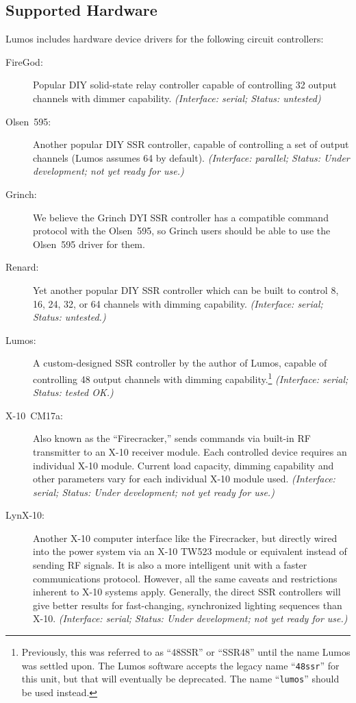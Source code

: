 \documentclass{article}
\begin{document}
\subsection{Supported Hardware}
Lumos includes hardware device drivers for the following circuit controllers:
\begin{description}
 \item[FireGod:] Popular DIY solid-state relay controller capable of
  controlling 32 output channels with dimmer capability.
  {\em (Interface: serial; Status: untested)\/}
 \item[Olsen~595:] Another popular DIY SSR controller, capable of controlling
  a set of output channels (Lumos assumes 64 by default).
  {\em (Interface: parallel; Status: Under development; not yet ready for use.)\/}
 \item[Grinch:] We believe the Grinch DYI SSR controller has a compatible
  command protocol with the Olsen~595, so Grinch users should be able to use
  the Olsen~595 driver for them.
 \item[Renard:] Yet another popular DIY SSR controller which can be built
  to control 8, 16, 24, 32, or 64 channels with dimming capability.
  {\em (Interface: serial; Status: untested.)\/}
 \item[Lumos:] A custom-designed SSR controller by the author of Lumos, 
  capable of controlling 48 output channels with dimming capability.\footnote{Previously,
  this was referred to as ``48SSR'' or ``SSR48'' until the name Lumos was settled upon.
  The Lumos software accepts the legacy name ``{\tt 48ssr}'' for this unit, but that
  will eventually be deprecated.  The name ``{\tt lumos}'' should be used instead.}
  {\em (Interface: serial; Status: tested OK.)\/}
 \item[X-10~CM17a:] Also known as the ``Firecracker,'' sends commands via 
  built-in RF transmitter to an X-10 receiver module.  Each controlled device
  requires an individual X-10 module.  Current load capacity, dimming
  capability and other parameters vary for each individual X-10 module used.
  {\em (Interface: serial; Status: Under development; not yet ready for use.)\/}
 \item[LynX-10:] Another X-10 computer interface like the Firecracker, but
  directly wired into the power system via an X-10 TW523 module or equivalent
  instead of sending RF signals.  It is also a more intelligent unit with a
  faster communications protocol.  However, all the same caveats and
  restrictions inherent to X-10 systems apply.  Generally, the direct SSR
  controllers will give better results for fast-changing, synchronized
  lighting sequences than X-10.
  {\em (Interface: serial; Status: Under development; not yet ready for use.)\/}
\end{description}
\end{document}
